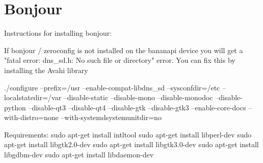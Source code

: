 \section{Bonjour}

Instructions for installing bonjour:

If bonjour / zeroconfig is not installed on the bananapi device you will get a "fatal error: dns\_sd.h: No such file or directory" error. You can fix this by installing the Avahi library


./configure --prefix=/usr  --enable-compat-libdns\_sd  --sysconfdir=/etc  --localstatedir=/var  --disable-static  --disable-mono  --disable-monodoc  --disable-python  --disable-qt3  --disable-qt4   --disable-gtk  --disable-gtk3  --enable-core-docs  --with-distro=none --with-systemdsystemunitdir=no





Requirements:
sudo apt-get install intltool
sudo apt-get install libperl-dev
sudo apt-get install libgtk2.0-dev
sudo apt-get install libgtk3.0-dev
sudo apt-get install libgdbm-dev
sudo apt-get install libdaemon-dev
